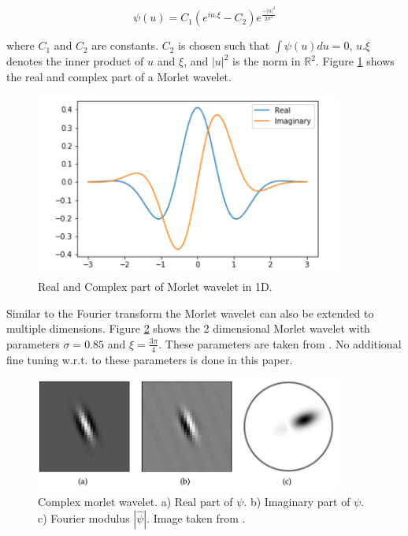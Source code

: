 \begin{equation}
\psi(u) = C_1 (e^{iu.\xi} - C_2) e^{\frac{-|u|^2}{2\sigma^2}}
\label{eq:morlet2d}
\end{equation}


where $C_1$ and $C_2$ are constants. $C_2$ is chosen such that $\int \psi(u) du = 0$, $u.\xi$ denotes the inner product of $u$ and $\xi$, and $|u|^2$ is the norm in $\mathbb{R}^2$. 
Figure \ref{fig:morlet1d} shows the real and complex part of a Morlet wavelet.

\begin{figure}[!htb]
	\centering
	\includegraphics[width = 0.9\textwidth]{images/Morlet_wavelet_1D.png}
	\caption{Real and Complex part of Morlet wavelet in 1D. \protect\footnotemark}
	\label{fig:morlet1d}
\end{figure}


Similar to the Fourier transform the Morlet wavelet can also be extended to multiple dimensions. 
Figure \ref{fig:morlet2d} shows the 2 dimensional Morlet wavelet with parameters $\sigma = 0.85$ and $\xi = \frac{3\pi}{4}$. These parameters are taken from \cite{scatteringTransform2012}. No additional fine tuning w.r.t. to these parameters is done in this paper. 

\begin{figure}[!htb]
	\centering
	\includegraphics[width = 0.9\textwidth]{images/morlet2d.png}
	\caption{Complex morlet wavelet. a) Real part of $\psi$. b) Imaginary part of $\psi$. c) Fourier modulus $|\hat{\psi}|$. Image taken from \cite{scatteringTransform2012}.}
	\label{fig:morlet2d}
\end{figure}

